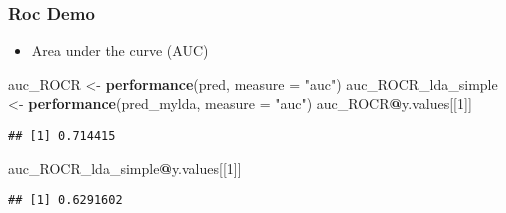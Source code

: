 \documentclass[
  shownotes,
  xcolor={svgnames},
  hyperref={colorlinks,citecolor=DarkBlue,linkcolor=DarkRed,urlcolor=DarkBlue}
  , aspectratio=169]{beamer}
\newenvironment{Shaded}{\begin{snugshade}}{\end{snugshade}}
\newcommand{\DataTypeTok}[1]{\textcolor[rgb]{0.13,0.29,0.53}{#1}}
\newcommand{\DecValTok}[1]{\textcolor[rgb]{0.00,0.00,0.81}{#1}}
\newcommand{\KeywordTok}[1]{\textcolor[rgb]{0.13,0.29,0.53}{\textbf{#1}}}
\newcommand{\NormalTok}[1]{#1}
\newcommand{\OperatorTok}[1]{\textcolor[rgb]{0.81,0.36,0.00}{\textbf{#1}}}
\newcommand{\StringTok}[1]{\textcolor[rgb]{0.31,0.60,0.02}{#1}}
\begin{document}
\begin{frame}[fragile]
\frametitle{Roc Demo}
\begin{itemize}
  \item Area under the curve (AUC)

\end{itemize}
\begin{scriptsize}
\begin{Shaded}
\begin{Highlighting}[]
\NormalTok{auc\_ROCR \textless{}{-}}\StringTok{ }\KeywordTok{performance}\NormalTok{(pred, }\DataTypeTok{measure =} \StringTok{"auc"}\NormalTok{)}
\NormalTok{auc\_ROCR\_lda\_simple \textless{}{-}}\StringTok{ }\KeywordTok{performance}\NormalTok{(pred\_mylda, }\DataTypeTok{measure =} \StringTok{"auc"}\NormalTok{)}
\NormalTok{auc\_ROCR}\OperatorTok{@}\NormalTok{y.values[[}\DecValTok{1}\NormalTok{]]}
\end{Highlighting}
\end{Shaded}

\begin{verbatim}
## [1] 0.714415
\end{verbatim}


\begin{Shaded}
\begin{Highlighting}[]
\NormalTok{auc\_ROCR\_lda\_simple}\OperatorTok{@}\NormalTok{y.values[[}\DecValTok{1}\NormalTok{]]}
\end{Highlighting}
\end{Shaded}


\begin{verbatim}
## [1] 0.6291602
\end{verbatim}
\end{scriptsize}

\end{frame}

\end{document}

